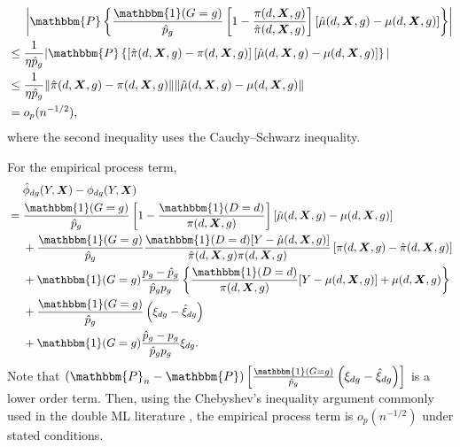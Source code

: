 \documentclass[12pt,a4paper]{article}
\def\X{{\boldsymbol X}}
\def\one{\mathbbm{1}}
\def\P{\mathbbm{P}}
\begin{document}
\begin{align*}
    &\phantom{{}={}} \left|\P\left\{ \frac{\one(G=g)}{\hat{p}_g}  \left[1- \frac{\pi(d,\X,g)}{\hat{\pi}(d, \X,g)}\right] \left[\hat{\mu}(d,\X,g) - \mu(d,\X,g)\right] \right\} \right| \\
    & \leq \frac{1}{\eta \hat{p}_g} | \P \left\{ \left[ \hat{\pi}(d, \X,g)- \pi(d,\X,g)\right]   \left[\hat{\mu}(d,\X,g) - \mu(d,\X,g) \right] \right\} | \\
    & \leq \frac{1}{\eta \hat{p}_g}  \| \hat{\pi}(d, \X,g)- \pi(d,\X,g) \| \|\hat{\mu}(d,\X,g) - \mu(d,\X,g) \| \\
    &= o_p(n^{-1/2}),
\end{align*}
where the second inequality uses the Cauchy–Schwarz inequality. 

For the empirical process term,
\begin{align*}
    &\phantom{{}={}} \hat{\phi}_{dg}(Y,\X)- \phi_{dg}(Y,\X) \\
    &= \frac{\one(G=g)}{\hat{p}_{g}} \left[ 1-\frac{\one(D=d)}{\pi(d,\X,g)} \right] \left[\hat{\mu}(d,\X,g)-\mu(d,\X,g)\right]  \\
    &\phantom{{}={}} + \frac{\one(G=g)}{\hat{p}_{g}} \frac{\one(D=d)[Y-\hat{\mu}(d,\X,g)]}{\hat{\pi}(d,\X,g)\pi(d,\X,g)}\left[\pi(d,\X,g)-\hat{\pi}(d,\X,g)\right] \\
    &\phantom{{}={}} + \one(G=g) \frac{p_g-\hat{p}_g}{\hat{p}_g p_g} \left\{ \frac{\one(D=d)}{\pi(d, \X,g)} [Y-\mu(d,\X,g)] + \mu(d,\X,g) \right\} \\
    &\phantom{{}={}} + \frac{\one(G=g)}{\hat{p}_{g}} \left(\xi_{dg}-\hat{\xi}_{dg} \right) \\
    &\phantom{{}={}} + \one(G=g) \frac{\hat{p}_g-p_g}{\hat{p}_g p_g}\xi_{dg}.
\end{align*}
Note that $(\P_n-\P) \left[ \frac{\one(G=g)}{\hat{p}_{g}} \left(\xi_{dg}-\hat{\xi}_{dg} \right) \right]$ is a lower order term. Then, using the Chebyshev's inequality argument commonly used in the double ML literature \citep{chernozhukov_doubledebiasedneyman_2017}, the empirical process term is $o_p(n^{-1/2})$ under stated conditions. 
\end{document}
